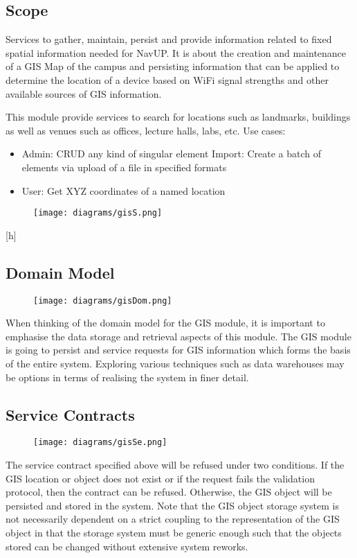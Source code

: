\documentclass[12pt]{article}
\begin{document}
\subsection{Scope}
Services to gather, maintain, persist and provide information related to fixed spatial information needed for NavUP.  It is about the creation and maintenance of a GIS Map of the campus and persisting  information that can be applied to determine the location of a device based on WiFi signal strengths and other available sources of GIS information. 

This module provide services to search for locations such as landmarks, buildings as well as venues such as offices, lecture halls, labs, etc.
Use cases:
\begin{itemize}
\item Admin:
    CRUD any kind of singular element
    Import: Create a batch of elements via upload of a file in specified formats
\item User:
    Get XYZ coordinates of a named location

\end{itemize}
\begin{figure}
\centering
\texttt{[image: diagrams/gisS.png]}

\end{figure}[h]
\subsection{Domain Model}
\begin{figure}
\centering
\texttt{[image: diagrams/gisDom.png]}

\end{figure}
When thinking of the domain model for the GIS module, it is important to emphasise the data storage and retrieval aspects of this module. The GIS module is going to persist and service requests for GIS information which forms the basis of the entire system. Exploring various techniques such as data warehouses may be options in terms of realising the system in finer detail.

\subsection{Service Contracts}
\begin{figure}[h]
\centering
\texttt{[image: diagrams/gisSe.png]}

\end{figure}
The service contract specified above will be refused under two conditions. If the GIS location or object does not exist or if the request fails the validation protocol, then the contract can be refused. Otherwise, the GIS object will be persisted and stored in the system. Note that the GIS object storage system is not necessarily dependent on a strict coupling to the representation of the GIS object in that the storage system must be generic enough such that the objects stored can be changed without extensive system reworks.
\end{document}
